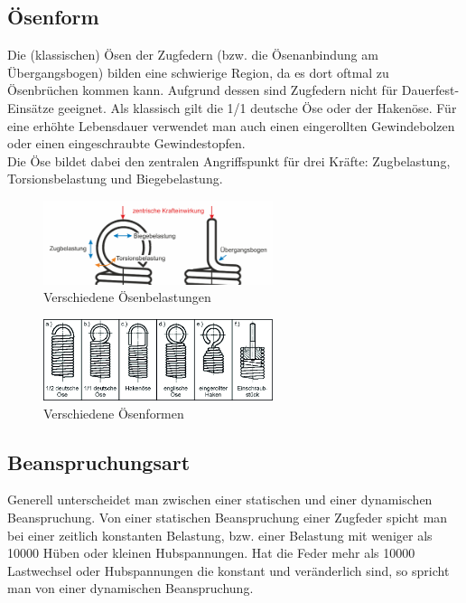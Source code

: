\subsection{Ösenform}
Die (klassischen) Ösen der Zugfedern (bzw. die Ösenanbindung am Übergangsbogen) bilden eine schwierige Region, da es dort oftmal zu Ösenbrüchen
kommen kann. Aufgrund dessen sind Zugfedern nicht für Dauerfest-Einsätze geeignet.
Als klassisch gilt die 1/1 deutsche Öse oder der Hakenöse.
Für eine erhöhte Lebensdauer verwendet man auch einen eingerollten Gewindebolzen 
oder einen eingeschraubte Gewindestopfen.\\
Die Öse bildet dabei den zentralen Angriffspunkt für drei Kräfte: Zugbelastung, Torsionsbelastung und Biegebelastung.
\begin{figure}[H]
    \centering
    \includegraphics[width=0.6\textwidth]{bilder/Input/Oesenbelastung.jpg}
    \caption{Verschiedene Ösenbelastungen \cite{EiZ}}
\end{figure}
\begin{figure}[H]
    \centering
    \includegraphics[width=0.6\textwidth]{bilder/Input/Oesenformen.jpg}
    \caption{Verschiedene Ösenformen \cite{AusM2}}
\end{figure}

\subsection{Beanspruchungsart}
Generell unterscheidet man zwischen einer statischen und einer dynamischen Beanspruchung.
Von einer statischen Beanspruchung einer Zugfeder spicht man bei einer zeitlich
konstanten Belastung, bzw. einer Belastung mit weniger als 10000 Hüben oder 
kleinen Hubspannungen.
Hat die Feder mehr als 10000 Lastwechsel oder Hubspannungen die konstant und veränderlich sind,
so spricht man von einer dynamischen Beanspruchung.\cite{BeAZ}

